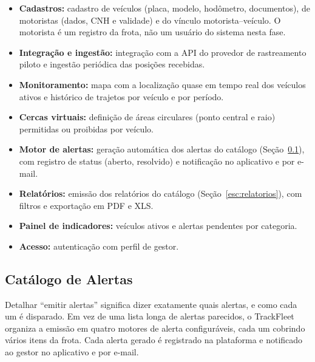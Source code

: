 \documentclass[11pt,a4paper]{article}
\begin{document}
\begin{itemize}[itemsep=3pt]
  \item \textbf{Cadastros:} cadastro de veículos (placa, modelo, hodômetro, documentos), de motoristas (dados, CNH e validade) e do vínculo motorista--veículo. O motorista é um registro da frota, não um usuário do sistema nesta fase.
  \item \textbf{Integração e ingestão:} integração com a API do provedor de rastreamento piloto e ingestão periódica das posições recebidas.
  \item \textbf{Monitoramento:} mapa com a localização quase em tempo real dos veículos ativos e histórico de trajetos por veículo e por período.
  \item \textbf{Cercas virtuais:} definição de áreas circulares (ponto central e raio) permitidas ou proibidas por veículo.
  \item \textbf{Motor de alertas:} geração automática dos alertas do catálogo (Seção~\ref{esc:alertas}), com registro de status (aberto, resolvido) e notificação no aplicativo e por e-mail.
  \item \textbf{Relatórios:} emissão dos relatórios do catálogo (Seção~\ref{esc:relatorios}), com filtros e exportação em PDF e XLS.
  \item \textbf{Painel de indicadores:} veículos ativos e alertas pendentes por categoria.
  \item \textbf{Acesso:} autenticação com perfil de gestor.
\end{itemize}

\subsection{Catálogo de Alertas}\label{esc:alertas}
Detalhar ``emitir alertas'' significa dizer exatamente quais alertas, e como cada um é disparado. Em vez de uma lista longa de alertas parecidos, o TrackFleet organiza a emissão em quatro motores de alerta configuráveis, cada um cobrindo vários itens da frota. Cada alerta gerado é registrado na plataforma e notificado ao gestor no aplicativo e por e-mail.
\end{document}
